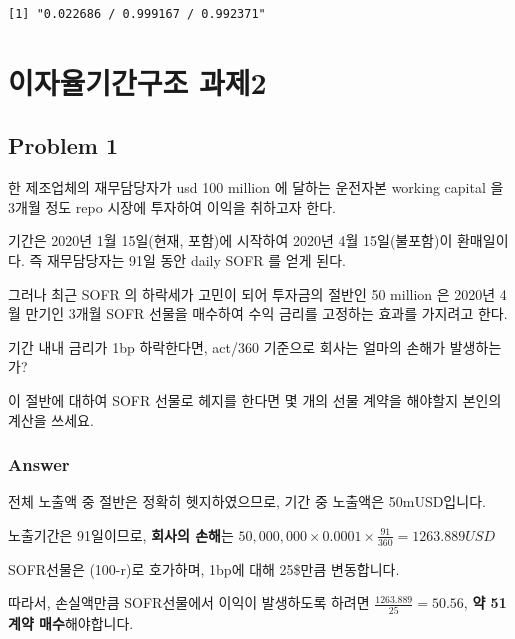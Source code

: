 \documentclass[
  a4paper,
  DIV=11,
  numbers=noendperiod]{scrreprt}
\begin{document}
\begin{verbatim}
[1] "0.022686 / 0.999167 / 0.992371"
\end{verbatim}

\chapter*{이자율기간구조
과제2}\label{uxc774uxc790uxc728uxae30uxac04uxad6cuxc870-uxacfcuxc81c2}


\section*{Problem 1}\label{problem-1-1}


한 제조업체의 재무담당자가 usd 100 million 에 달하는 운전자본 working
capital 을 3개월 정도 repo 시장에 투자하여 이익을 취하고자 한다.

기간은 2020년 1월 15일(현재, 포함)에 시작하여 2020년 4월 15일(불포함)이
환매일이다. 즉 재무담당자는 91일 동안 daily SOFR 를 얻게 된다.

그러나 최근 SOFR 의 하락세가 고민이 되어 투자금의 절반인 50 million 은
2020년 4월 만기인 3개월 SOFR 선물을 매수하여 수익 금리를 고정하는 효과를
가지려고 한다.

기간 내내 금리가 1bp 하락한다면, act/360 기준으로 회사는 얼마의 손해가
발생하는가?

이 절반에 대하여 SOFR 선물로 헤지를 한다면 몇 개의 선물 계약을 해야할지
본인의 계산을 쓰세요.

\subsection*{Answer}\label{answer-5}

전체 노출액 중 절반은 정확히 헷지하였으므로, 기간 중 노출액은
50mUSD입니다.

노출기간은 91일이므로, \textbf{회사의 손해}는
\(50,000,000\times 0.0001\times\frac{91}{360}=1263.889USD\)

SOFR선물은 (100-r)로 호가하며, 1bp에 대해 25\$만큼 변동합니다.

따라서, 손실액만큼 SOFR선물에서 이익이 발생하도록 하려면
\(\frac{1263.889}{25}=50.56\), \textbf{약 51계약 매수}해야합니다.
\end{document}
